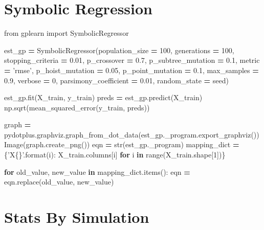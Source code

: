 \documentclass[]{book}
\newenvironment{Shaded}{\begin{snugshade}}{\end{snugshade}}
\newcommand{\BuiltInTok}[1]{#1}
\newcommand{\ControlFlowTok}[1]{\textcolor[rgb]{0.13,0.29,0.53}{\textbf{#1}}}
\newcommand{\DecValTok}[1]{\textcolor[rgb]{0.00,0.00,0.81}{#1}}
\newcommand{\FloatTok}[1]{\textcolor[rgb]{0.00,0.00,0.81}{#1}}
\newcommand{\ImportTok}[1]{#1}
\newcommand{\KeywordTok}[1]{\textcolor[rgb]{0.13,0.29,0.53}{\textbf{#1}}}
\newcommand{\NormalTok}[1]{#1}
\newcommand{\OperatorTok}[1]{\textcolor[rgb]{0.81,0.36,0.00}{\textbf{#1}}}
\newcommand{\SpecialCharTok}[1]{\textcolor[rgb]{0.00,0.00,0.00}{#1}}
\newcommand{\StringTok}[1]{\textcolor[rgb]{0.31,0.60,0.02}{#1}}
\begin{document}
\hypertarget{symbolic-regression}{%
\section{Symbolic Regression}\label{symbolic-regression}}

\begin{Shaded}
\begin{Highlighting}[]
\ImportTok{from}\NormalTok{ gplearn }\ImportTok{import}\NormalTok{ SymbolicRegressor}

\NormalTok{est_gp }\OperatorTok{=}\NormalTok{ SymbolicRegressor(population_size }\OperatorTok{=} \DecValTok{100}\NormalTok{, generations }\OperatorTok{=} \DecValTok{100}\NormalTok{, stopping_criteria }\OperatorTok{=} \FloatTok{0.01}\NormalTok{, p_crossover }\OperatorTok{=} \FloatTok{0.7}\NormalTok{, p_subtree_mutation }\OperatorTok{=} \FloatTok{0.1}\NormalTok{, metric }\OperatorTok{=} \StringTok{'rmse'}\NormalTok{, p_hoist_mutation }\OperatorTok{=} \FloatTok{0.05}\NormalTok{, p_point_mutation }\OperatorTok{=} \FloatTok{0.1}\NormalTok{, max_samples }\OperatorTok{=} \FloatTok{0.9}\NormalTok{, verbose }\OperatorTok{=} \DecValTok{0}\NormalTok{, parsimony_coefficient }\OperatorTok{=} \FloatTok{0.01}\NormalTok{, random_state }\OperatorTok{=}\NormalTok{ seed)}

\NormalTok{est_gp.fit(X_train, y_train)}
\NormalTok{preds }\OperatorTok{=}\NormalTok{ est_gp.predict(X_train)}
\NormalTok{np.sqrt(mean_squared_error(y_train, preds))}

\NormalTok{graph }\OperatorTok{=}\NormalTok{ pydotplus.graphviz.graph_from_dot_data(est_gp._program.export_graphviz())}
\NormalTok{Image(graph.create_png())}
\NormalTok{eqn }\OperatorTok{=} \BuiltInTok{str}\NormalTok{(est_gp._program)}
\NormalTok{mapping_dict }\OperatorTok{=}\NormalTok{ \{}\StringTok{'X}\SpecialCharTok{\{\}}\StringTok{'}\NormalTok{.}\BuiltInTok{format}\NormalTok{(i): X_train.columns[i] }\ControlFlowTok{for}\NormalTok{ i }\KeywordTok{in} \BuiltInTok{range}\NormalTok{(X_train.shape[}\DecValTok{1}\NormalTok{])\}}

\ControlFlowTok{for}\NormalTok{ old_value, new_value }\KeywordTok{in}\NormalTok{ mapping_dict.items():}
\NormalTok{  eqn }\OperatorTok{=}\NormalTok{ eqn.replace(old_value, new_value)}
\end{Highlighting}
\end{Shaded}

\hypertarget{stats-by-simulation}{%
\section{Stats By Simulation}\label{stats-by-simulation}}
\end{document}
